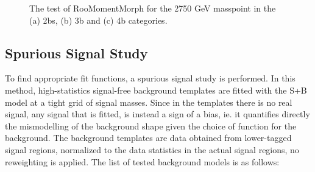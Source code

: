 \begin{figure}[htbp!]
\begin{center}
\caption{The test of RooMomentMorph for the 2750 GeV masspoint in the (a) 2bs, (b) 3b and (c) 4b categories.}
\label{fig:directfit:morphing}
\end{center}
\end{figure}


\subsection{Spurious Signal Study}

To find appropriate fit functions, a spurious signal study is performed. In this method, high-statistics signal-free background templates are fitted with the S+B model at a tight grid of signal masses. Since in the templates there is no real signal, any signal that is fitted, is instead a sign of a bias, ie. it quantifies directly the mismodelling of the background shape given the choice of function for the background.
The background templates are data obtained from lower-tagged signal regions, normalized to the data statistics in the actual signal regions, no reweighting is applied. The list of tested background models is as follows:

